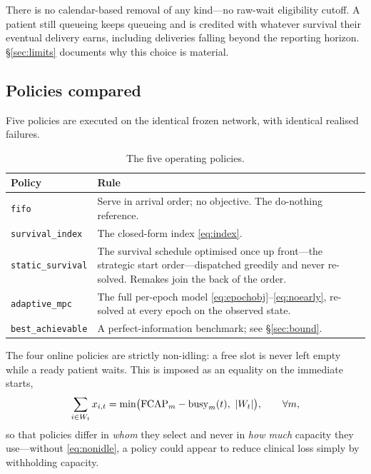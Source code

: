 There is no calendar-based removal of any kind---no raw-wait eligibility
cutoff. A patient still queueing keeps queueing and is credited with whatever
survival their eventual delivery earns, including deliveries falling beyond the
reporting horizon. \S\ref{sec:limits} documents why this choice is material.

\subsection{Policies compared}
\label{sec:policies}

Five policies are executed on the identical frozen network, with identical
realised failures.

\begin{table}[htbp]
  \centering
  \caption{The five operating policies.}
  \label{tab:policies}
  \begin{tabularx}{\textwidth}{lX}
    \toprule
    Policy & Rule \\
    \midrule
    \texttt{fifo} & Serve in arrival order; no objective. The do-nothing
      reference. \\
    \texttt{survival\_index} & The closed-form index \eqref{eq:index}. \\
    \texttt{static\_survival} & The survival schedule optimised once up
      front---the strategic start order---dispatched greedily and never
      re-solved. Remakes join the back of the order. \\
    \texttt{adaptive\_mpc} & The full per-epoch model
      \eqref{eq:epochobj}--\eqref{eq:noearly}, re-solved at every epoch on the
      observed state. \\
    \texttt{best\_achievable} & A perfect-information benchmark; see
      \S\ref{sec:bound}. \\
    \bottomrule
  \end{tabularx}
\end{table}

The four online policies are strictly non-idling: a free slot is never left
empty while a ready patient waits. This is imposed as an equality on the
immediate starts,
\begin{equation}
  \sum_{i \in W_t} x_{i,t} = \min\bigl(\mathrm{FCAP}_m - \mathrm{busy}_m(t),\ |W_t|\bigr),
  \qquad \forall m, \label{eq:nonidle}
\end{equation}
so that policies differ in \emph{whom} they select and never in \emph{how much}
capacity they use---without \eqref{eq:nonidle}, a policy could appear to reduce
clinical loss simply by withholding capacity.

